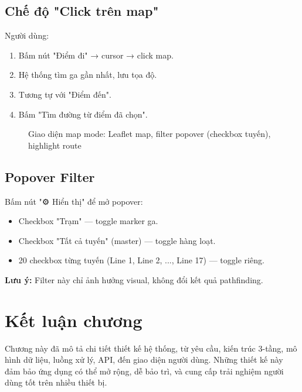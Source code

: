 \subsection{Chế độ "Click trên map"}

Người dùng:
\begin{enumerate}
  \item Bấm nút "Điểm đi" → cursor → click map.
  \item Hệ thống tìm ga gần nhất, lưu tọa độ.
  \item Tương tự với "Điểm đến".
  \item Bấm "Tìm đường từ điểm đã chọn".
\end{enumerate}

\begin{figure}[H]
  \centering
  \caption{Giao diện map mode: Leaflet map, filter popover (checkbox tuyến), highlight route}
  \label{fig:ui-map}
\end{figure}

\subsection{Popover Filter}

Bấm nút "⚙ Hiển thị" để mở popover:
\begin{itemize}
  \item Checkbox "Trạm" --- toggle marker ga.
  \item Checkbox "Tất cả tuyến" (master) --- toggle hàng loạt.
  \item 20 checkbox từng tuyến (Line 1, Line 2, ..., Line 17) --- toggle riêng.
\end{itemize}

\textbf{Lưu ý:} Filter này chỉ ảnh hưởng visual, không đổi kết quả pathfinding.

\section{Kết luận chương}

Chương này đã mô tả chi tiết thiết kế hệ thống, từ yêu cầu, kiến trúc 3-tầng, mô hình dữ liệu, luồng xử lý, API, đến giao diện người dùng. Những thiết kế này đảm bảo ứng dụng có thể mở rộng, dễ bảo trì, và cung cấp trải nghiệm người dùng tốt trên nhiều thiết bị.
